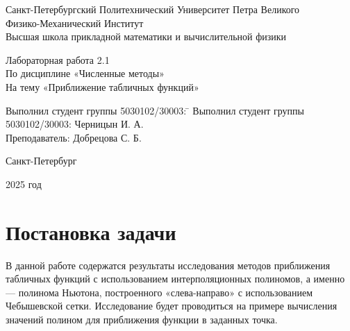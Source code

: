 \documentclass{article}
\begin{document}
\begin{titlepage}

    \centering
    
    {\large Санкт-Петербургский Политехнический Университет Петра Великого \\
					Физико-Механический Институт \\
					Высшая школа прикладной математики и вычислительной физики\par}
					
	\vspace{1cm}
    
    {\LARGE Лабораторная работа 2.1 \\ 
    По дисциплине «Численные методы» \\ 
    На тему «Приближение табличных функций»\par}
    
    \vspace{1.5cm} 
    
     \vfill
    
	\begin{center}
        \begin{tabbing}
            Выполнил студент группы 5030102/30003: \= \kill
            Выполнил студент группы 5030102/30003: \> \hspace{8cm}Черницын И. А. \\
            Преподаватель: \> \hspace{8cm}Добрецова С. Б.
        \end{tabbing}
    \end{center}
    
    \vspace{1cm}
    
    {\large Санкт-Петербург\par}
    
    {\large 2025 год\par}
    
\end{titlepage}

\tableofcontents

\section{Постановка задачи}

В данной работе содержатся результаты исследования методов приближения табличных функций с использованием интерполяционных полиномов, а именно --- полинома Ньютона, построенного «слева-направо» с использованием Чебышевской сетки. Исследование будет проводиться на примере вычисления значений полином для приближения функции в заданных точка.
\end{document}
